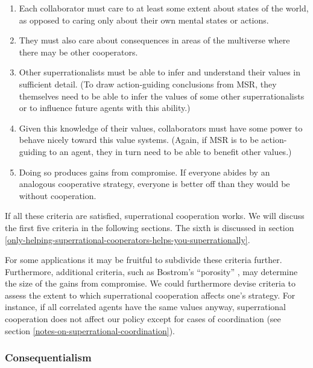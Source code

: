 \begin{enumerate}
\def\labelenumi{\arabic{enumi}.}
\item
  Each collaborator must care to at least some extent about states of
  the world, as opposed to caring only about their own mental states or
  actions.
\item
  They must also care about consequences in areas of the multiverse
  where there may be other cooperators.
\item
  Other superrationalists must be able to infer and understand their
  values in sufficient detail. (To draw action-guiding conclusions from
  MSR, they themselves need to be able to infer the values of some other
  superrationalists or to influence future agents with this ability.)
\item
  Given this knowledge of their values, collaborators must have some
  power to behave nicely toward this value systems. (Again, if MSR is to
  be action-guiding to an agent, they in turn need to be able to benefit
  other values.)
\item
  Doing so produces gains from compromise. If everyone abides by an
  analogous cooperative strategy, everyone is better off than they would
  be without cooperation.
\end{enumerate}

If all these criteria are satisfied, superrational cooperation works. We
will discuss the first five criteria in the following sections. The
sixth is discussed in section
\ref{only-helping-superrational-cooperators-helps-you-superrationally}.

For some applications it may be fruitful to subdivide these criteria
further. Furthermore, additional criteria, such as
Bostrom's ``porosity'' \citeyear{Bostrom2014-gy}, may determine the
size of the gains from compromise. We could furthermore devise criteria
to assess the extent to which superrational cooperation affects one's
strategy. For instance, if all correlated agents have the same values
anyway, superrational cooperation does not affect our policy except for
cases of coordination (see section
\ref{notes-on-superrational-coordination}).

\hypertarget{consequentialism}{\subsubsection{Consequentialism}\label{consequentialism}}


